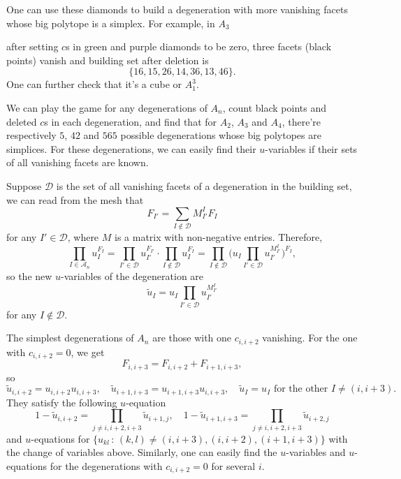 \documentclass[hidelinks,12pt]{article}
\begin{document}
One can use these diamonds to build a degeneration with more vanishing facets whose big polytope is a simplex. For example, in $A_3$
\begin{center}
\end{center}
after setting $c$s in green and purple diamonds to be zero, three facets (black points) vanish and building set after deletion is 
\[
\{16,15,26,14,36,13,46\}.
\]
One can further check that it's a cube or $A_1^3$.

We can play the game for any degenerations of $A_n$, count black points and deleted $c$s in each degeneration, and find that for $A_2$, $A_3$ and $A_4$, there're respectively $5$, $42$ and $565$ possible degenerations whose big polytopes are simplices. For these degenerations, we can easily find their $u$-variables if their sets of all vanishing facets are known.

Suppose $\mathscr D$ is the set of all vanishing facets of a degeneration in the building set, 
we can read from the mesh that
\[
F_{I'}=\sum_{I\not\in \mathscr D}M_{I'}^IF_I
\]
for any $I'\in \mathscr D$, where $M$ is a matrix with non-negative entries. 
Therefore,
\[
\prod_{I\in \mathscr A_n}u_{I}^{F_{I}}=
\prod_{I'\in \mathscr D}u_{I'}^{F_{I'}}
\cdot
\prod_{I\not\in \mathscr D}u_{I}^{F_{I}}=
\prod_{I\not\in \mathscr D}\biggl(
u_I\prod_{I'\in \mathscr D}u_{I'}^{M_{I'}^I}
\bigg)^{F_I},
\]
so the new $u$-variables of the degeneration are
\[
    \tilde u_{I}=u_I\prod_{I'\in \mathscr D}u_{I'}^{M_{I'}^I}
\]
for any $I\not\in \mathscr D$. 

The simplest degenerations of $A_n$ are those with one $c_{i,i+2}$ vanishing. For the one with $c_{i,i+2}=0$, we get 
\[
F_{i,i+3}=F_{i,i+2}+F_{i+1,i+3},
\]
so 
\[
\tilde u_{i,i+2}=u_{i,i+2} u_{i,i+3},\quad 
\tilde u_{i+1,i+3}=u_{i+1,i+3} u_{i,i+3},\quad 
\tilde u_I=u_I \text{ for the other $I\neq (i,i+3)$}.
\]
They satisfy the following $u$-equation
\[
1-\tilde u_{i,i+2}=\prod_{j\neq i,i+2,i+3} \tilde u_{i+1,j},\quad 
1-\tilde u_{i+1,i+3}=\prod_{j\neq i,i+2,i+3} \tilde u_{i+2,j}
\]
and $u$-equations for $\{u_{kl}\,:\, (k,l)\neq (i,i+3),(i,i+2),(i+1,i+3)\}$ with the change of variables above. Similarly, one can easily find the $u$-variables and $u$-equations for the degenerations with $c_{i,i+2}=0$ for several $i$.
\end{document}
